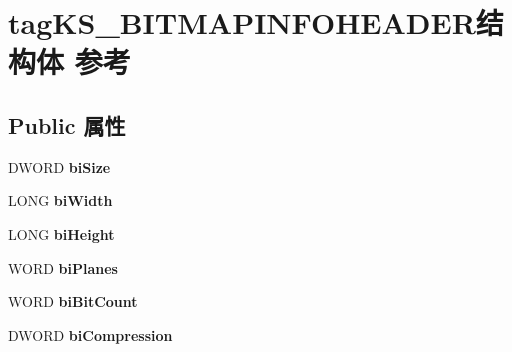 \hypertarget{structtag_k_s___b_i_t_m_a_p_i_n_f_o_h_e_a_d_e_r}{}\section{tag\+K\+S\+\_\+\+B\+I\+T\+M\+A\+P\+I\+N\+F\+O\+H\+E\+A\+D\+E\+R结构体 参考}
\label{structtag_k_s___b_i_t_m_a_p_i_n_f_o_h_e_a_d_e_r}
\subsection*{Public 属性}
\begin{DoxyCompactItemize}
\item 
\mbox{\label{structtag_k_s___b_i_t_m_a_p_i_n_f_o_h_e_a_d_e_r_af5a16b846a32f014dcb84ca8fae128dc}} 
D\+W\+O\+RD {\bfseries bi\+Size}
\item 
\mbox{\label{structtag_k_s___b_i_t_m_a_p_i_n_f_o_h_e_a_d_e_r_a09ea3577d5759179b4c52dbe3e3cc95d}} 
L\+O\+NG {\bfseries bi\+Width}
\item 
\mbox{\label{structtag_k_s___b_i_t_m_a_p_i_n_f_o_h_e_a_d_e_r_a27992a6e076cc0e595577c117b0d03a7}} 
L\+O\+NG {\bfseries bi\+Height}
\item 
\mbox{\label{structtag_k_s___b_i_t_m_a_p_i_n_f_o_h_e_a_d_e_r_a926d8069eca56ee56b18171865bd1219}} 
W\+O\+RD {\bfseries bi\+Planes}
\item 
\mbox{\label{structtag_k_s___b_i_t_m_a_p_i_n_f_o_h_e_a_d_e_r_ab347122d28fe8e428226c7938eab3ed6}} 
W\+O\+RD {\bfseries bi\+Bit\+Count}
\item 
\mbox{\label{structtag_k_s___b_i_t_m_a_p_i_n_f_o_h_e_a_d_e_r_a13525348f3d18bdfd751c05be11ed3a0}} 
D\+W\+O\+RD {\bfseries bi\+Compression}
\item 
\mbox{\label{structtag_k_s___b_i_t_m_a_p_i_n_f_o_h_e_a_d_e_r_a38031d589ee54687e98b70f8763fd1f6}} 

\end{DoxyCompactItemize}
